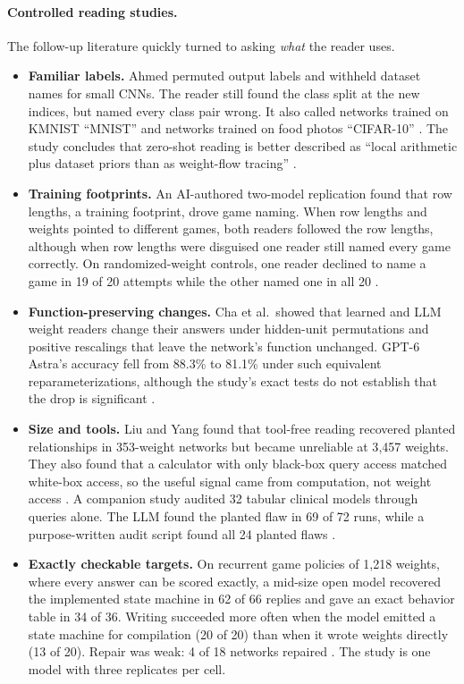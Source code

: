 \paragraph{Controlled reading studies.} The follow-up literature quickly turned to asking \emph{what} the reader uses.
\begin{itemize}[leftmargin=*,itemsep=2pt]
\item \textbf{Familiar labels.} Ahmed permuted output labels and withheld dataset names for small CNNs. The reader still found the class split at the new indices, but named every class pair wrong. It also called networks trained on KMNIST ``MNIST'' and networks trained on food photos ``CIFAR-10'' \citep{ax2611_08070}. The study concludes that zero-shot reading is better described as ``local arithmetic plus dataset priors than as weight-flow tracing'' \citep{ax2611_08070}.
\item \textbf{Training footprints.} An AI-authored two-model replication found that row lengths, a training footprint, drove game naming. When row lengths and weights pointed to different games, both readers followed the row lengths, although when row lengths were disguised one reader still named every game correctly. On randomized-weight controls, one reader declined to name a game in 19 of 20 attempts while the other named one in all 20 \citep{zen24373915}.
\item \textbf{Function-preserving changes.} Cha et al.\ showed that learned and LLM weight readers change their answers under hidden-unit permutations and positive rescalings that leave the network's function unchanged. GPT-6 Astra's accuracy fell from 88.3\% to 81.1\% under such equivalent reparameterizations, although the study's exact tests do not establish that the drop is significant \citep{ax2611_05798}.
\item \textbf{Size and tools.} Liu and Yang found that tool-free reading recovered planted relationships in 353-weight networks but became unreliable at 3{,}457 weights. They also found that a calculator with only black-box query access matched white-box access, so the useful signal came from computation, not weight access \citep{ax2611_07847}. A companion study audited 32 tabular clinical models through queries alone. The LLM found the planted flaw in 69 of 72 runs, while a purpose-written audit script found all 24 planted flaws \citep{ax2611_24877}.
\item \textbf{Exactly checkable targets.} On recurrent game policies of 1{,}218 weights, where every answer can be scored exactly, a mid-size open model recovered the implemented state machine in 62 of 66 replies and gave an exact behavior table in 34 of 36. Writing succeeded more often when the model emitted a state machine for compilation (20 of 20) than when it wrote weights directly (13 of 20). Repair was weak: 4 of 18 networks repaired \citep{ax2611_31979}. The study is one model with three replicates per cell.
\end{itemize}

